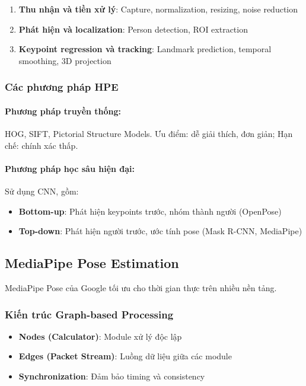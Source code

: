 \begin{enumerate}
    \item \textbf{Thu nhận và tiền xử lý}: Capture, normalization, resizing, noise reduction
    \item \textbf{Phát hiện và localization}: Person detection, ROI extraction
    \item \textbf{Keypoint regression và tracking}: Landmark prediction, temporal smoothing, 3D projection
\end{enumerate}

\subsubsection{Các phương pháp HPE}

\paragraph{Phương pháp truyền thống:} HOG, SIFT, Pictorial Structure Models. Ưu điểm: dễ giải thích, đơn giản; Hạn chế: chính xác thấp.  

\paragraph{Phương pháp học sâu hiện đại:} Sử dụng CNN, gồm:
\begin{itemize}
\item \textbf{Bottom-up}: Phát hiện keypoints trước, nhóm thành người (OpenPose)
\item \textbf{Top-down}: Phát hiện người trước, ước tính pose (Mask R-CNN, MediaPipe)
\end{itemize}

\subsection{MediaPipe Pose Estimation}

MediaPipe Pose của Google tối ưu cho thời gian thực trên nhiều nền tảng.

\subsubsection{Kiến trúc Graph-based Processing}

\begin{itemize}
    \item \textbf{Nodes (Calculator)}: Module xử lý độc lập
    \item \textbf{Edges (Packet Stream)}: Luồng dữ liệu giữa các module
    \item \textbf{Synchronization}: Đảm bảo timing và consistency
\end{itemize}

